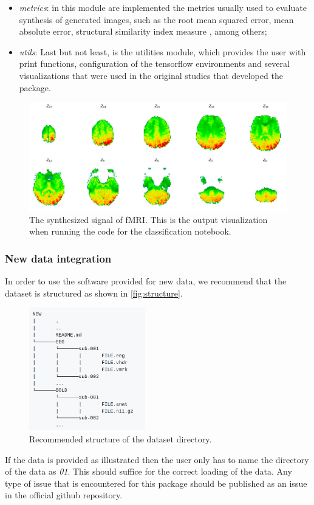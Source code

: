 \begin{itemize}
    \item \textit{metrics}: in this module are implemented the metrics usually used to evaluate synthesis of generated images, such as the root mean squared error, mean absolute error, structural similarity index measure \citep{wang2004image}, among others;
    \item \textit{utils}: Last but not least, is the utilities module, which provides the user with print functions, configuration of the tensorflow environments and several visualizations that were used in the original studies that developed the package.
\end{itemize}

\begin{figure}[t]
    \centering
    \includegraphics[width=\textwidth]{figures/sythesized.png}
    \caption{The synthesized signal of fMRI. This is the output visualization when running the code for the classification notebook.}
    \label{fig:synthesized}
\end{figure}

\subsubsection{New data integration}\label{section:new_data}

In order to use the software provided for new data, we recommend that the dataset is structured as shown in \autoref{fig:structure}.
\begin{figure}[ht]
    \centering
    \includegraphics[width=0.45\textwidth]{figures/structure.png}
    \caption{Recommended structure of the dataset directory.}
    \label{fig:structure}
\end{figure}
If the data is provided as illustrated then the user only has to name the directory of the data as \textit{01}. This should suffice for the correct loading of the data. Any type of issue that is encountered for this package should be published as an issue in the official github repository.

